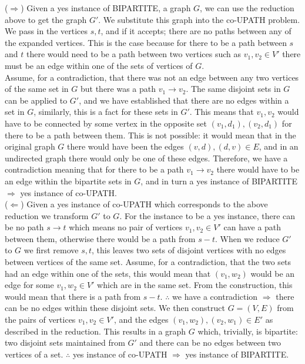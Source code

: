 \documentclass[12pt]{article}
\begin{document}
\begin{enumerate}
\begin{enumerate}
($\Rightarrow $) Given a yes instance of BIPARTITE, a graph $G$, we can use the reduction above to get the graph $G'$. We substitute this graph into the co-UPATH problem. We pass in the vertices $s,t$, and if it accepts; there are no paths between any of the expanded vertices. This is the case because for there to be a path between $s$ and $t$ there would need to be a path between two vertices such as $v_1,v_2 \in V'$ there must be an edge within one of the sets of vertices of $G$. \\Assume, for a contradiction, that there was not an edge between any two vertices of the same set in $G$ but there was a path $v_1\rightarrow v_2$. The same disjoint sets in $G$ can be applied to $G'$, and we have established that there are no edges within a set in $G$, similarly, this is a fact for these sets in $G'$. This means that $v_1,v_2$ would have to be connected by some vertex in the opposite set $(v_1,d_1),(v_2,d_1)$ for there to be a path between them. This is not possible: it would mean that in the original graph $G$ there would have been the edges $(v,d),(d,v)\in E$, and in an undirected graph there would only be one of these edges. Therefore, we have a contradiction meaning that for there to be a path $v_1\rightarrow v_2$ there would have to be an edge within the bipartite sets in $G$, and in turn a yes instance of BIPARTITE $\Rightarrow $ yes instance of co-UPATH. \\
($\Leftarrow $) Given a yes instance of co-UPATH which corresponds to the above reduction we transform $G'$ to $G$. For the instance to be a yes instance, there can be no path $s\rightarrow t$ which means no pair of vertices $v_1,v_2 \in V'$ can have a path between them, otherwise there would be a path from $s-t$. When we reduce $G'$ to $G$ we first remove $s,t$, this leaves two sets of disjoint vertices with no edges between vertices of the same set. Assume, for a contradiction, that the two sets had an edge within one of the sets, this would mean that $(v_1,w_2)$ would be an edge for some $v_1,w_2 \in V'$ which are in the same set. From the construction, this would mean that there is a path from $s-t$. $\therefore $ we have a contradiction $\Rightarrow $ there can be no edges within these disjoint sets. We then construct $G=(V,E) $ from the pairs of vertices $v_1,v_2 \in V'$, and the edges $(v_1,w_2),(v_2,w_1) \in E'$ as described in the reduction. This results in a graph $G$ which, trivially, is bipartite: two disjoint sets maintained from $G'$ and there can be no edges between two vertices of a set. $\therefore $ yes instance of co-UPATH $\Rightarrow $ yes instance of BIPARTITE. \\

\end{enumerate}
\end{enumerate}
\end{document}
